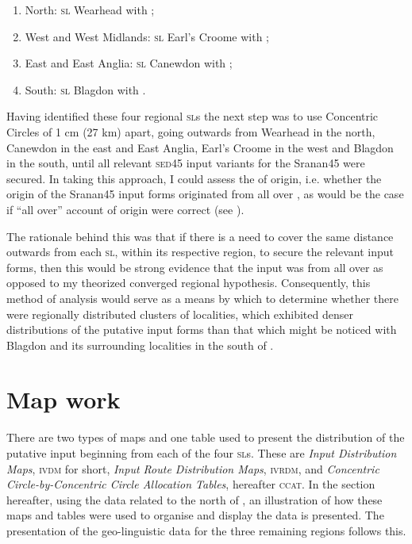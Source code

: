 \begin{enumerate}
\item {North:  \textsc{sl} Wearhead with ;}
\item {West and West Midlands:  \textsc{sl} Earl's Croome with ;}
\item {East and East Anglia:  \textsc{sl} Canewdon with ;}
\item {South:  \textsc{sl} Blagdon with .}
\end{enumerate}
 

Having identified these four regional  \textsc{sl}s the next step was to use Concentric Circles of 1 cm (27 km) apart, going outwards from Wearhead in the north, Canewdon in the east and East Anglia, Earl's Croome in the west and Blagdon in the south, until all relevant \textsc{sed45} input variants for the Sranan45 were secured. In taking this approach, I could assess the  of origin, i.e. whether the origin of the Sranan45  input forms originated from all over , as would be the case if \citet{Mufwene08, Mufwene01} ``all over'' account of origin were correct (see ).

The rationale behind this was that if there is a need to cover the same distance outwards from each \textsc{sl}, within its respective region, to secure the relevant input forms, then this would be strong evidence that the input was from all over  as opposed to my theorized converged regional  hypothesis. Consequently, this method of analysis would serve as a means by which to determine whether there were regionally distributed clusters of localities, which exhibited denser distributions of the putative input forms than that which might be noticed with Blagdon and its surrounding localities in the south of .

\section{Map work}
There are two types of maps and one table used to present the distribution of the putative input beginning from each of the four  \textsc{sl}s. These are \emph{Input  Distribution Maps}, \textsc{\textsc{ivdm}} for short,  \emph{Input  Route Distribution Maps}, \textsc{ivrdm}, and  \emph{Concentric Circle-by-Concentric Circle Allocation Tables}, hereafter \textsc{ccat}. In the section hereafter, using the data related to the north of , an illustration of how these maps and tables were used to organise and display the data is presented. The presentation of the geo-linguistic data for the three remaining regions follows this.

